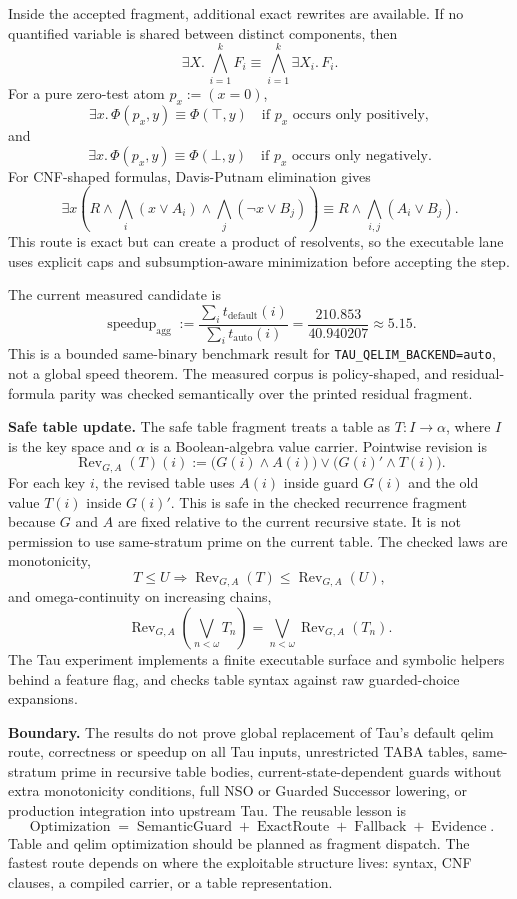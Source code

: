 \documentclass[10pt]{article}
\begin{document}
Inside the accepted fragment, additional exact rewrites are available. If no
quantified variable is shared between distinct components, then
\[
\exists X.\,\bigwedge_{i=1}^{k}F_i
\equiv
\bigwedge_{i=1}^{k}\exists X_i.\,F_i.
\]
For a pure zero-test atom \(p_x:=(x=0)\),
\[
\exists x.\,\Phi(p_x,y)\equiv \Phi(\top,y)
\quad\text{if }p_x\text{ occurs only positively},
\]
and
\[
\exists x.\,\Phi(p_x,y)\equiv \Phi(\bot,y)
\quad\text{if }p_x\text{ occurs only negatively}.
\]
For CNF-shaped formulas, Davis-Putnam elimination gives
\[
\exists x
\left(R\wedge\bigwedge_i(x\vee A_i)\wedge
\bigwedge_j(\neg x\vee B_j)\right)
\equiv
R\wedge\bigwedge_{i,j}(A_i\vee B_j).
\]
This route is exact but can create a product of resolvents, so the executable
lane uses explicit caps and subsumption-aware minimization before accepting the
step.

The current measured candidate is
\[
\operatorname{speedup}_{\mathrm{agg}}
:=\frac{\sum_i t_{\mathrm{default}}(i)}
        {\sum_i t_{\mathrm{auto}}(i)}
=\frac{210.853}{40.940207}\approx 5.15.
\]
This is a bounded same-binary benchmark result for
\texttt{TAU\_QELIM\_BACKEND=auto}, not a global speed theorem. The measured
corpus is policy-shaped, and residual-formula parity was checked semantically
over the printed residual fragment.

\textbf{Safe table update.}
The safe table fragment treats a table as \(T:I\to\alpha\), where \(I\) is the
key space and \(\alpha\) is a Boolean-algebra value carrier. Pointwise revision is
\[
\operatorname{Rev}_{G,A}(T)(i):=
\bigl(G(i)\wedge A(i)\bigr)\vee
\bigl(G(i)'\wedge T(i)\bigr).
\]
For each key \(i\), the revised table uses \(A(i)\) inside guard \(G(i)\) and
the old value \(T(i)\) inside \(G(i)'\). This is safe in the checked recurrence
fragment because \(G\) and \(A\) are fixed relative to the current recursive
state. It is not permission to use same-stratum prime on the current table.
The checked laws are monotonicity,
\[
T\le U\Longrightarrow
\operatorname{Rev}_{G,A}(T)\le\operatorname{Rev}_{G,A}(U),
\]
and omega-continuity on increasing chains,
\[
\operatorname{Rev}_{G,A}\!\left(\bigvee_{n<\omega}T_n\right)
=
\bigvee_{n<\omega}\operatorname{Rev}_{G,A}(T_n).
\]
The Tau experiment implements a finite executable surface and symbolic helpers
behind a feature flag, and checks table syntax against raw guarded-choice
expansions.

\textbf{Boundary.}
The results do not prove global replacement of Tau's default qelim route,
correctness or speedup on all Tau inputs, unrestricted TABA tables,
same-stratum prime in recursive table bodies, current-state-dependent guards
without extra monotonicity conditions, full NSO or Guarded Successor lowering,
or production integration into upstream Tau. The reusable lesson is
\[
\operatorname{Optimization}
=\operatorname{SemanticGuard}+\operatorname{ExactRoute}
+\operatorname{Fallback}+\operatorname{Evidence}.
\]
Table and qelim optimization should be planned as fragment dispatch. The
fastest route depends on where the exploitable structure lives: syntax, CNF
clauses, a compiled carrier, or a table representation.
\end{document}
